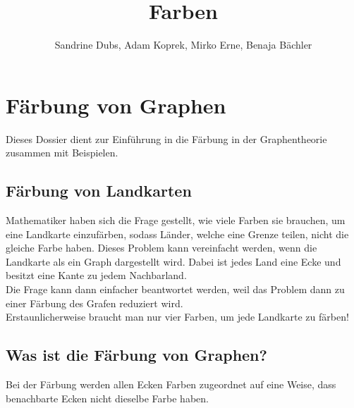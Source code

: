 \documentclass{article}
\title{Farben}
\author{Sandrine Dubs, Adam Koprek, Mirko Erne, Benaja Bächler}
\begin{document}
\maketitle

\section{Färbung von Graphen}

Dieses Dossier dient zur Einführung in die Färbung in der Graphentheorie zusammen mit Beispielen.

\subsection{Färbung von Landkarten}

Mathematiker haben sich die Frage gestellt, wie viele Farben sie brauchen, um eine Landkarte einzufärben, sodass Länder, welche eine Grenze teilen, nicht die gleiche Farbe haben. Dieses Problem kann vereinfacht werden, wenn die Landkarte als ein Graph dargestellt wird. Dabei ist jedes Land eine Ecke und besitzt eine Kante zu jedem Nachbarland. \\
Die Frage kann dann einfacher beantwortet werden, weil das Problem dann zu einer Färbung des Grafen reduziert wird.\\
Erstaunlicherweise braucht man nur vier Farben, um jede Landkarte zu färben!

\subsection{Was ist die Färbung von Graphen?}

Bei der Färbung werden allen Ecken Farben zugeordnet auf eine Weise, dass benachbarte Ecken nicht dieselbe Farbe haben.\\\\
\end{document}
